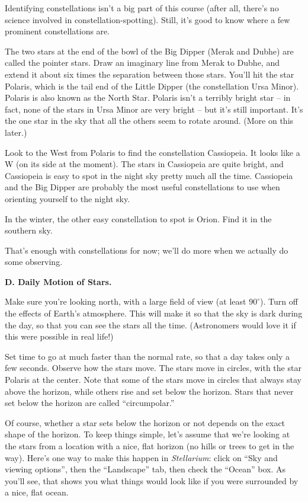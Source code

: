 Identifying constellations isn't a big part of this course (after
all, there's no science involved in constellation-spotting).  Still, it's
good to know where a few prominent constellations are.

The two stars at the end of the bowl of the Big Dipper (Merak and Dubhe)
are called the pointer stars.  Draw an imaginary line from Merak to Dubhe,
and extend it about six times the separation between those stars.
You'll hit the star Polaris, which is the tail end of the
Little Dipper (the constellation Ursa Minor).  Polaris is also known
as the North Star.  Polaris isn't a terribly bright star -- in fact,
none of the stars in Ursa Minor are very bright -- but it's still
important.  It's the one star in the sky that all the others seem
to rotate around.  (More on this later.)

Look to the West from Polaris to find the constellation Cassiopeia.  It
looks like a W (on its side at the moment).  The stars in Cassiopeia
are quite bright, and Cassiopeia is easy to spot in the night sky pretty
much all the time.  Cassiopeia and the Big Dipper are probably the most
useful constellations to use when orienting yourself to the night sky.

In the winter, the other easy constellation to spot is Orion. Find
it in the southern sky.

That's enough with constellations for now; we'll do more when we actually
do some observing.

\bigskip

{\bf D. Daily Motion of Stars.}

Make sure you're looking north, with a large field
of view (at least $90^\circ$).  Turn off the effects of Earth's 
atmosphere.
This will make it so that the sky is dark during the day, so that
you can see the stars all the time.  (Astronomers would love
it if this were possible in real life!)

Set time to go at much faster than the normal rate,
so that a day takes only a few seconds.
Observe how the stars move.
The stars move in circles, with the star Polaris at the center.
Note that some of the stars move in circles that always stay
above the horizon, while others rise and set below the horizon.
Stars that never set below the horizon are called ``circumpolar.''

Of course, whether a star sets below the horizon or not depends on
the exact shape of the horizon. To keep things simple, let's assume that
we're looking at the stars from a location with a nice, flat horizon
(no hills or trees to get in the way). Here's one way to make this happen
in \textit{Stellarium}: click on ``Sky and viewing options'', then
the ``Landscape'' tab, then check the ``Ocean'' box. As you'll
see, that shows you what things would look like if you were surrounded
by a nice, flat ocean.

